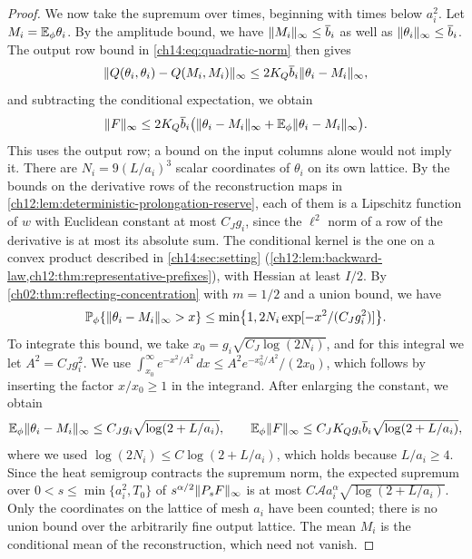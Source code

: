 \begin{proof}
We now take the supremum over times, beginning with times below $a_i^2$. Let $M_i=\mathbb E_\phi\theta_i$. By the amplitude bound, we have $\lVert M_i\rVert_\infty\le\overline b_i$ as well as $\lVert \theta_i\rVert_\infty\le\overline b_i$. The output row bound in \eqref{ch14:eq:quadratic-norm} then gives
\[
 \lVert Q(\theta_i,\theta_i)-Q(M_i,M_i)\rVert_\infty\le2K_Q\overline b_i\lVert \theta_i-M_i\rVert_\infty,
\]
and subtracting the conditional expectation, we obtain
\begin{equation}\label{ch14:eq:native-quadratic-deviation}
 \lVert F\rVert_\infty\le2K_Q\overline b_i\bigl(\lVert \theta_i-M_i\rVert_\infty+\mathbb E_\phi\lVert \theta_i-M_i\rVert_\infty\bigr).
\end{equation}
This uses the output row; a bound on the input columns alone would not imply it. There are $N_i=9(L/a_i)^3$ scalar coordinates of $\theta_i$ on its own lattice. By the bounds on the derivative rows of the reconstruction maps in \cref{ch12:lem:deterministic-prolongation-reserve}, each of them is a Lipschitz function of $w$ with Euclidean constant at most $C_Jg_i$, since the $\ell^2$ norm of a row of the derivative is at most its absolute sum. The conditional kernel is the one on a convex product described in \cref{ch14:sec:setting} (\cref{ch12:lem:backward-law,ch12:thm:representative-prefixes}), with Hessian at least $I/2$. By \cref{ch02:thm:reflecting-concentration} with $m=1/2$ and a union bound, we have
\begin{equation}\label{ch14:eq:native-coordinate-maximum}
 \mathbb P_\phi\{\lVert \theta_i-M_i\rVert_\infty>x\}\le\min\bigl\{1,2N_i\exp[-x^2/(C_Jg_i^2)]\bigr\}.
\end{equation}
To integrate this bound, we take $x_0=g_i\sqrt{C_J\log(2N_i)}$, and for this integral we let $A^2=C_Jg_i^2$. We use $\int_{x_0}^\infty e^{-x^2/A^2}\,dx\le A^2e^{-x_0^2/A^2}/(2x_0)$, which follows by inserting the factor $x/x_0\ge1$ in the integrand. After enlarging the constant, we obtain
\[
 \mathbb E_\phi\lVert \theta_i-M_i\rVert_\infty\le C_Jg_i\sqrt{\log(2+L/a_i)},\qquad\mathbb E_\phi\lVert F\rVert_\infty\le C_JK_Qg_i\overline b_i\sqrt{\log(2+L/a_i)},
\]
where we used $\log(2N_i)\le C\log(2+L/a_i)$, which holds because $L/a_i\ge4$. Since the heat semigroup contracts the supremum norm, the expected supremum over $0<s\le\min\{a_i^2,T_0\}$ of $s^{\alpha/2}\lVert P_sF\rVert_\infty$ is at most $C\mathcal Aa_i^\alpha\sqrt{\log(2+L/a_i)}$. Only the coordinates on the lattice of mesh $a_i$ have been counted; there is no union bound over the arbitrarily fine output lattice. The mean $M_i$ is the conditional mean of the reconstruction, which need not vanish.


\end{proof}
